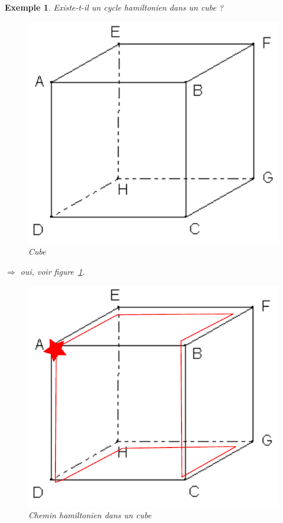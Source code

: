 \documentclass{article}
\newtheorem{exemple}{Exemple}[section]
\begin{document}
\begin{sffamily}
\begin{exemple} Existe-t-il un cycle hamiltonien dans un cube ? \\
\begin{figure}[h!]
    \begin{center}
    \includegraphics[scale=0.3]{cube.pdf}
    \caption{Cube}
    \end{center}	
\end{figure}
$\Longrightarrow$ oui, voir figure~\ref{chcube}.
\begin{figure}[h!]
    \begin{center}
    \includegraphics[scale=0.3]{cubehc.pdf}
    \caption{Chemin hamiltonien dans un cube}
    \label{chcube}
    \end{center}	
\end{figure}


\end{exemple}
\end{sffamily}
\end{document}

